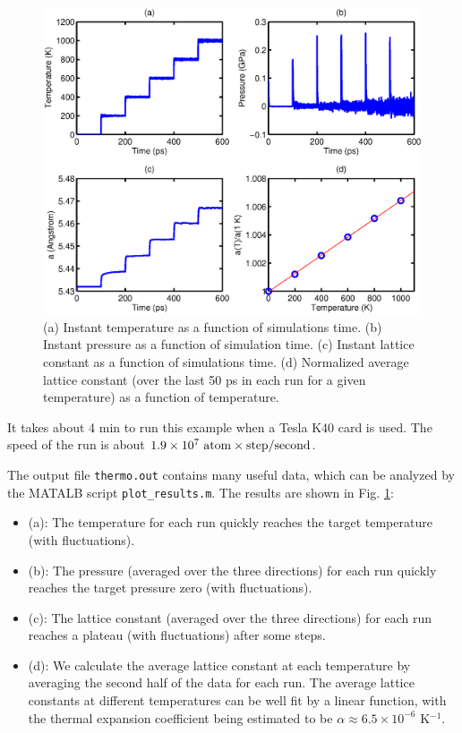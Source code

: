 \documentclass[12pt,a4paper]{report}
\begin{document}
\begin{figure}[ht]
\begin{center}
\includegraphics[width=\columnwidth]{ex1.eps}
\caption{(a) Instant temperature as a function of simulations time. (b) Instant pressure as a function of simulation time. (c) Instant lattice constant as a function of simulations time. (d) Normalized average lattice constant (over the last 50 ps in each run for a given temperature) as a function of temperature.}
\label{figure:lattice_constant}
\end{center}
\end{figure}

It takes about 4 min to run this example when a Tesla K40 card is used. The speed of the run is about $1.9 \times 10^7 ~\textmd{atom} \times \textmd{step} / \textmd{second}$.

The output file \verb"thermo.out" contains many useful data, which can be analyzed by the MATALB script \verb"plot_results.m". The results are shown in Fig. \ref{figure:lattice_constant}:
\begin{itemize}
\item (a): The temperature for each run quickly reaches the target temperature (with fluctuations).
\item (b): The pressure (averaged over the three directions) for each run quickly reaches the target pressure zero (with fluctuations).
\item (c): The lattice constant (averaged over the three directions) for each run reaches a plateau (with fluctuations) after some steps.
\item (d): We calculate the average lattice constant at each temperature by averaging the second half of the data for each run. The average lattice constants at different temperatures can be well fit by a linear function, with the thermal expansion coefficient being estimated to be $\alpha \approx 6.5\times10^{-6}$ K$^{-1}$.
\end{itemize}
\end{document}
